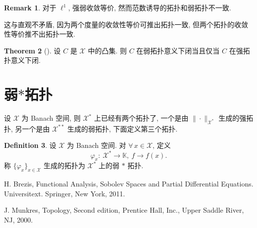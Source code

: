 \documentclass[a4paper,11pt]{article}
\theoremstyle{definition}
\newtheorem{theorem}{Theorem}
\newtheorem{remark}[theorem]{Remark}
\newtheorem{definition}[theorem]{Definition}
\begin{document}
\begin{remark}
    对于 $ \ell^1 $, 强弱收敛等价, 然而范数诱导的拓扑和弱拓扑不一致.
    
    这与直观不矛盾, 因为两个度量的收敛性等价可推出拓扑一致, 但两个拓扑的收敛性等价推不出拓扑一致.
\end{remark}


\begin{theorem} [{\cite[Theorem 3.7]{b11}}]
    设 $ C $ 是 $ \mathcal{X} $ 中的凸集. 
    则 $ C $ 在弱拓扑意义下闭当且仅当 $ C $ 在强拓扑意义下闭.
\end{theorem}


\section{弱$*$拓扑}

设 $ \mathcal{X} $ 为 Banach 空间, 则 $ \mathcal{X}^* $ 上已经有两个拓扑了, 
一个是由 $ \| \cdot \|_{\mathcal{X}^*} $ 生成的强拓扑,
另一个是由 $ \mathcal{X}^{**} $ 生成的弱拓扑,
下面定义第三个拓扑.

\begin{definition}
    设 $ \mathcal{X} $ 为 Banach 空间. 对 $ \forall \, x \in \mathcal{X} $, 定义
    $$
        \varphi_x :\ \mathcal{X}^* \to \mathbb{K},\ f \to f(x).
    $$
    称 $ \{ \varphi_x \}_{x \in \mathcal{X}} $ 生成的拓扑为 $ \mathcal{X}^* $ 上的弱 $ * $ 拓扑.
\end{definition}


\begin{thebibliography}{99}  
    H. Brezis, Functional Analysis, Sobolev Spaces and Partial Differential Equations.
    Universitext. Springer, New York,  2011.
    
    J. Munkres, Topology, Second edition, Prentice Hall, Inc., Upper Saddle River, NJ, 2000.
\end{thebibliography}
\end{document}

